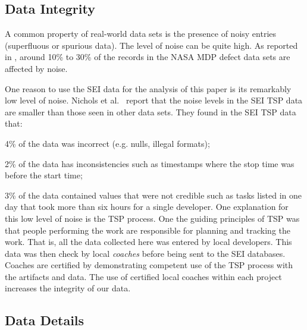  
\subsection{Data Integrity}

A common property of real-world data sets is the presence
of noisy entries (superfluous  or spurious data). 
The level of noise can be quite high. As reported
in \cite{shepperd12}, around
10\% to 30\%
of the records in the NASA MDP defect data sets are
affected by noise. 

One reason to use the SEI data for the analysis of this paper is its remarkably low level of noise.
Nichols et al.~\cite{shirai14}  report that
the noise levels in the SEI TSP data are smaller than those seen
in other data sets. They found in the SEI TSP data that:\bi 
\item
4\% of the data was incorrect (e.g. nulls, illegal formats);
\item  2\% of the data has inconsistencies such as timestamps
where the stop time was before the start time;
\item 3\% of the data contained values that were not credible
such as tasks listed in one day that took more than six hours for a single developer.
\ei 
One explanation for this low level of noise is the TSP process.
One the guiding principles of TSP was that  people performing the work are  responsible for planning and tracking the work. That is,  all the data collected here was entered
by local developers. This data was then check by local {\em coaches} before being sent to the SEI
databases. Coaches are certified by demonstrating competent use of the TSP process with the artifacts and data.
The use of certified local coaches within each project increases the integrity of our data.


\subsection{Data Details}
\label{sec:data-collection}


